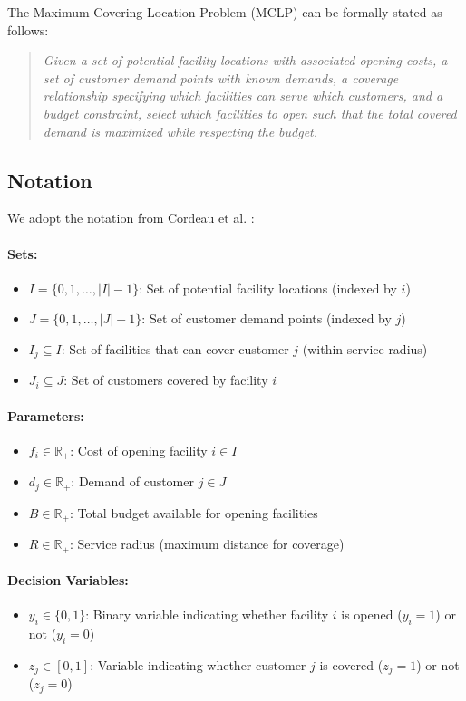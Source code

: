 \documentclass[11pt,a4paper]{article}
\newcommand{\R}{\mathbb{R}}
\begin{document}
The Maximum Covering Location Problem (MCLP) can be formally stated as follows:

\begin{quote}
\textit{Given a set of potential facility locations with associated opening costs, a set of customer demand points with known demands, a coverage relationship specifying which facilities can serve which customers, and a budget constraint, select which facilities to open such that the total covered demand is maximized while respecting the budget.}
\end{quote}

\subsection{Notation}

We adopt the notation from Cordeau et al. \cite{cordeau2019}:

\paragraph{Sets:}
\begin{itemize}
  \item $I = \{0, 1, \ldots, |I|-1\}$: Set of potential facility locations (indexed by $i$)
  \item $J = \{0, 1, \ldots, |J|-1\}$: Set of customer demand points (indexed by $j$)
  \item $I_j \subseteq I$: Set of facilities that can cover customer $j$ (within service radius)
  \item $J_i \subseteq J$: Set of customers covered by facility $i$
\end{itemize}

\paragraph{Parameters:}
\begin{itemize}
  \item $f_i \in \R_+$: Cost of opening facility $i \in I$
  \item $d_j \in \R_+$: Demand of customer $j \in J$
  \item $B \in \R_+$: Total budget available for opening facilities
  \item $R \in \R_+$: Service radius (maximum distance for coverage)
\end{itemize}

\paragraph{Decision Variables:}
\begin{itemize}
  \item $y_i \in \{0,1\}$: Binary variable indicating whether facility $i$ is opened ($y_i=1$) or not ($y_i=0$)
  \item $z_j \in [0,1]$: Variable indicating whether customer $j$ is covered ($z_j=1$) or not ($z_j=0$)
\end{itemize}
\end{document}
